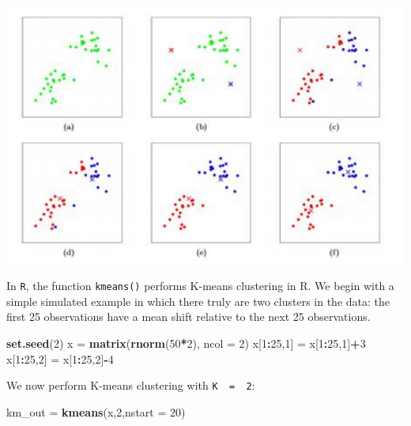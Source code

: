 \documentclass[openany]{book}
\newenvironment{Shaded}{\begin{snugshade}}{\end{snugshade}}
\newcommand{\DataTypeTok}[1]{\textcolor[rgb]{0.13,0.29,0.53}{#1}}
\newcommand{\DecValTok}[1]{\textcolor[rgb]{0.00,0.00,0.81}{#1}}
\newcommand{\KeywordTok}[1]{\textcolor[rgb]{0.13,0.29,0.53}{\textbf{#1}}}
\newcommand{\NormalTok}[1]{#1}
\newcommand{\OperatorTok}[1]{\textcolor[rgb]{0.81,0.36,0.00}{\textbf{#1}}}
\newcommand{\StringTok}[1]{\textcolor[rgb]{0.31,0.60,0.02}{#1}}
\begin{document}
\includegraphics[width=10\linewidth]{images/kmeans}

In \texttt{R}, the function \texttt{kmeans()} performs K-means clustering in R. We begin with
a simple simulated example in which there truly are two clusters in the
data: the first 25 observations have a mean shift relative to the next 25
observations.

\begin{Shaded}
\begin{Highlighting}[]
\KeywordTok{set.seed}\NormalTok{(}\DecValTok{2}\NormalTok{)}
\NormalTok{x =}\StringTok{ }\KeywordTok{matrix}\NormalTok{(}\KeywordTok{rnorm}\NormalTok{(}\DecValTok{50}\OperatorTok{*}\DecValTok{2}\NormalTok{), }\DataTypeTok{ncol =} \DecValTok{2}\NormalTok{)}
\NormalTok{x[}\DecValTok{1}\OperatorTok{:}\DecValTok{25}\NormalTok{,}\DecValTok{1}\NormalTok{] =}\StringTok{ }\NormalTok{x[}\DecValTok{1}\OperatorTok{:}\DecValTok{25}\NormalTok{,}\DecValTok{1}\NormalTok{]}\OperatorTok{+}\DecValTok{3}
\NormalTok{x[}\DecValTok{1}\OperatorTok{:}\DecValTok{25}\NormalTok{,}\DecValTok{2}\NormalTok{] =}\StringTok{ }\NormalTok{x[}\DecValTok{1}\OperatorTok{:}\DecValTok{25}\NormalTok{,}\DecValTok{2}\NormalTok{]}\OperatorTok{-}\DecValTok{4}
\end{Highlighting}
\end{Shaded}

We now perform K-means clustering with \texttt{K\ \ =\ \ 2}:

\begin{Shaded}
\begin{Highlighting}[]
\NormalTok{km_out =}\StringTok{ }\KeywordTok{kmeans}\NormalTok{(x,}\DecValTok{2}\NormalTok{,}\DataTypeTok{nstart =} \DecValTok{20}\NormalTok{)}
\end{Highlighting}
\end{Shaded}
\end{document}
